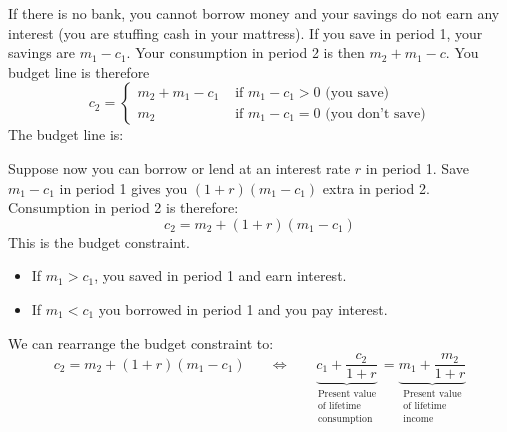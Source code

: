 \documentclass{article}
\begin{document}
If there is no bank, you cannot borrow money and your savings do not earn any interest (you are stuffing cash in your mattress). If you save in period 1, your savings are $m_1-c_1$. Your consumption in period 2 is then $m_2+m_1-c$. You budget line is therefore
\begin{equation*}
  c_2 = \begin{cases} m_2 + m_1 - c_1 & \text{ if } m_1 - c_1 > 0 \text{ (you save)} \\ m_2 & \text{ if } m_1 - c_1 = 0 \text{ (you don't save)} \end{cases}
\end{equation*}
The budget line is:
\begin{center}
\end{center}
Suppose now you can borrow or lend at an interest rate $r$ in period 1. Save $m_1-c_1$ in period 1 gives you $\left( 1+r \right)\left( m_1-c_1 \right)$ extra in period 2. Consumption in period 2 is therefore:
\begin{equation*}
  c_2 = m_2 + \left( 1+r \right)\left( m_1 - c_1 \right)
\end{equation*}
This is the budget constraint.
\begin{itemize}
  \item If $m_1 > c_1$, you saved in period 1 and earn interest.
  \item If $m_1 < c_1$ you borrowed in period 1 and you pay interest.
\end{itemize}
We can rearrange the budget constraint to:
\[
  c_2 = m_2 + \left( 1+r\right)\left( m_1-c_1 \right)
  \;\;\;\;\;\;\Longleftrightarrow \;\;\;\;\;\;
  \underbrace{c_1 + \frac{c_2}{1+r}}_{\substack{
    \text{Present value} \\ \text{of lifetime} \\ \text{consumption}}}
       =
  \underbrace{m_1 + \frac{m_2}{1+r}}_{\substack{
    \text{Present value} \\ \text{of lifetime} \\ \text{income}}}
\]
\end{document}
